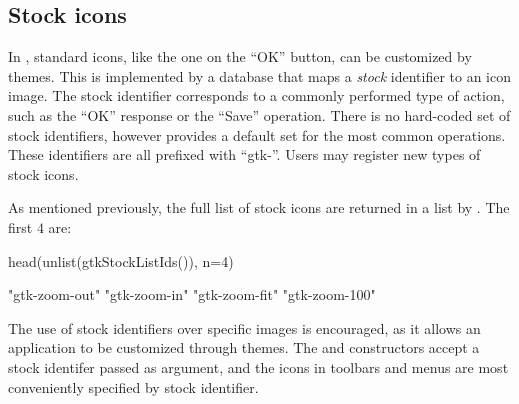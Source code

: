 \subsection{Stock icons}
\label{sec:RGtk2:stock-icons}

In \GTK\/, standard icons, like the one on the ``OK'' button, can be
customized by themes. This is implemented by a database that maps a
\textit{stock} identifier to an icon image. The stock identifier
corresponds to a commonly performed type of action, such as the ``OK''
response or the ``Save'' operation. There is no hard-coded set of
stock identifiers, however \GTK\/ provides a default set for the most
common operations. These identifiers are all prefixed with
``gtk-''. Users may register new types of stock icons.

As mentioned previously, the full list of stock icons are returned in
a list by . The first $4$ are:
\begin{Schunk}
\begin{Sinput}
 head(unlist(gtkStockListIds()), n=4)   
\end{Sinput}
\begin{Soutput}
[1] "gtk-zoom-out" "gtk-zoom-in"  "gtk-zoom-fit" "gtk-zoom-100"
\end{Soutput}
\end{Schunk}

The use of stock identifiers over specific images is encouraged, as it
allows an application to be customized through themes. The
 and  constructors accept
a stock identifer passed as  argument, and the icons in
toolbars and menus are most conveniently specified by stock
identifier. 





